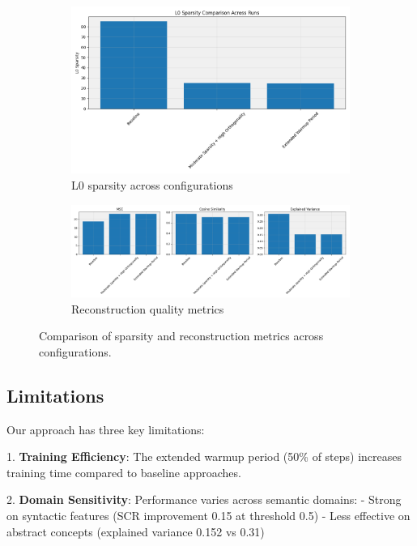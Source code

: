 \documentclass{article} %
\begin{document}
\begin{figure}[h]
\centering
\begin{subfigure}{0.49\textwidth}
\includegraphics[width=\textwidth]{sparsity_comparison.png}
\caption{L0 sparsity across configurations}
\label{fig:sparsity}
\end{subfigure}
\hfill
\begin{subfigure}{0.49\textwidth}
\includegraphics[width=\textwidth]{reconstruction_quality.png}
\caption{Reconstruction quality metrics}
\label{fig:reconstruction}
\end{subfigure}
\caption{Comparison of sparsity and reconstruction metrics across configurations.}
\label{fig:main_results}
\end{figure}

\subsection{Limitations}
Our approach has three key limitations:

1. \textbf{Training Efficiency}: The extended warmup period (50\% of steps) increases training time compared to baseline approaches.

2. \textbf{Domain Sensitivity}: Performance varies across semantic domains:
   - Strong on syntactic features (SCR improvement 0.15 at threshold 0.5)
   - Less effective on abstract concepts (explained variance 0.152 vs 0.31)
\end{document}
